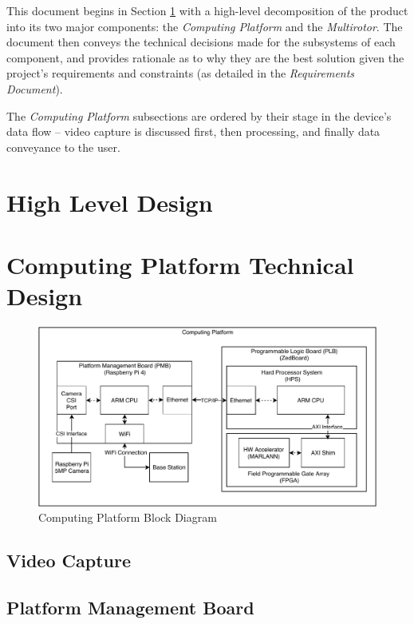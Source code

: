 \documentclass[10pt,letterpaper]{article}
\begin{document}
This document begins in Section \ref{high_level_design} with a high-level decomposition of the product into its two major components: the \textit{Computing Platform} and the \textit{Multirotor}. The document then conveys the technical decisions made for the subsystems of each component, and provides rationale as to why they are the best solution given the project's requirements and constraints (as detailed in the \textit{Requirements Document}). 

The \textit{Computing Platform} subsections are ordered by their stage in the device's data flow -- video capture is discussed first, then processing, and finally data conveyance to the user.

\section{High Level Design}\label{high_level_design}


\section{Computing Platform Technical Design}\label{computing_platform}

\begin{figure}\label{pcdiag}
\centering
\includegraphics[width=16.5cm]{img/pc_diagram.pdf}
\caption{Computing Platform Block Diagram}
\end{figure}

\subsection{Video Capture}\label{video_capture}


\subsection{Platform Management Board}\label{platform_management}

\end{document}
